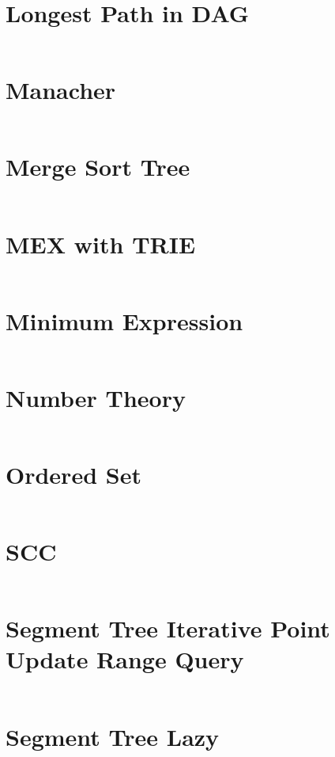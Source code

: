 \documentclass[10pt,a4paper,landscape]{article}
\begin{document}
\begin{multicols*}{3}
		\section{Longest Path in DAG}
		\inputminted{cpp}{codes/LONGEST_PATH_IN_DAG.cpp}
		
		\section{Manacher}
		\inputminted{cpp}{codes/MANACHER.cpp}
		
		\section{Merge Sort Tree}
		\inputminted{cpp}{codes/MERGE_SORT_TREE.cpp}
		
		\section{MEX with TRIE}
		\inputminted{cpp}{codes/MEX_WITH_TRIE.cpp}
		
		\section{Minimum Expression}
		\inputminted{cpp}{codes/MINIMUM_EXPRESSION.cpp}
		
		\section{Number Theory}
		\inputminted{cpp}{codes/NUMBER_THEORY.cpp}
		
		\section{Ordered Set}
		\inputminted{cpp}{codes/ORDERED_SET.cpp}
		
		\section{SCC}
		\inputminted{cpp}{codes/SCC.cpp}
		
		\section{Segment Tree Iterative Point Update Range Query}
		\inputminted{cpp}{codes/SEGMENT_TREE_ITERATIVE_PointUpdate_RangeQuery.cpp}
		
		\section{Segment Tree Lazy}
		\inputminted{cpp}{codes/SEGMENT_TREE_LAZY.cpp}
		

\end{multicols*}
\end{document}
